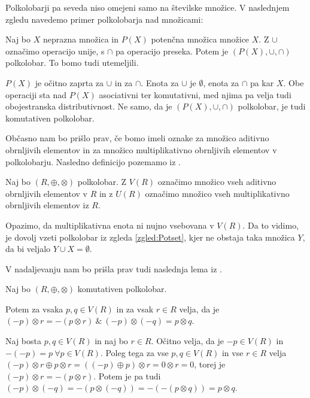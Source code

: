 \documentclass[mat1]{fmfdelo}
\begin{document}
Polkolobarji pa seveda niso omejeni samo na številske množice. V naslednjem zgledu navedemo primer polkolobarja nad množicami:
\begin{zgled} \label{zgled:Potset}
	Naj bo $X$ neprazna množica in $P(X)$ potenčna množica množice $X$. Z $\cup$ označimo operacijo unije, s $\cap$ pa operacijo preseka. Potem je $(P(X), \cup, \cap)$ polkolobar. To bomo tudi utemeljili.
	
	$P(X)$ je očitno zaprta za $\cup$ in za $\cap$. Enota za $\cup$ je $\emptyset$, enota za $\cap$ pa kar $X$. Obe operaciji sta nad $P(X)$ asociativni ter komutativni, med njima pa velja tudi obojestranska distributivnost. Ne samo, da je $(P(X), \cup, \cap)$ polkolobar, je tudi komutativen polkolobar.
\end{zgled}

Občasno nam bo prišlo prav, če bomo imeli oznake za množico aditivno obrnljivih elementov in za množico multiplikativno obrnljivih elementov v polkolobarju. Nasledno definicijo pozemamo iz \cite[str. $3$]{bib:Tanbase}.

\begin{definicija}
	Naj bo $(R, \oplus, \otimes)$ polkolobar. Z $V(R)$ označimo množico vseh aditivno obrnljivih elementov v $R$ in z $U(R)$ označimo množico vseh multiplikativno obrnljivih elementov iz $R$.
\end{definicija}

Opazimo, da multiplikativna enota ni nujno vsebovana v $V(R)$. Da to vidimo, je dovolj vzeti polkolobar iz zgleda \ref{zgled:Potset}, kjer ne obstaja taka množica $Y$, da bi veljalo $Y \cup X = \emptyset$.

V nadaljevanju nam bo prišla prav tudi naslednja lema iz \cite[lema 2\,1]{bib:Tanbase}.

\begin{lema} \label{lema:invvpolkolob}
	Naj bo $(R, \oplus, \otimes)$ komutativen polkolobar. 
	
	Potem za vsaka $p, q\in V(R)$ in za vsak $r\in R$ velja, da je $(-p)\otimes r = - (p\otimes r)~\&~ (-p)\otimes(-q) = p\otimes q$.
\end{lema}

\begin{dokaz}
	Naj bosta $p, q \in V(R)$ in naj bo $r\in R$. Očitno velja, da je $-p\in V(R)$ in $-(-p) = p~\forall p\in V(R)$. Poleg tega za vse $p, q\in V(R)$ in vse $r\in R$ velja $(-p)\otimes r \oplus p \otimes r = ((-p) \oplus p)\otimes r = 0\otimes r = 0$, torej je $(-p)\otimes r = -(p\otimes r)$. Potem je pa tudi $(-p)\otimes(-q) = -(p\otimes(-q)) = -(-(p\otimes q)) = p\otimes q$.
\end{dokaz}
\end{document}
